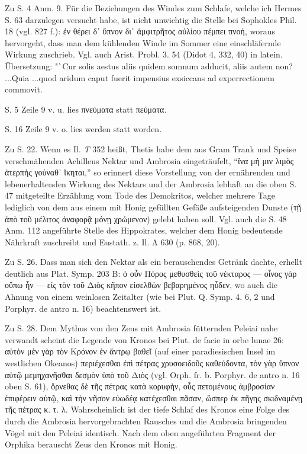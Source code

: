 \documentclass[a4paper, 11pt, oneside]{article}
\begin{document}
Zu S. 4 Anm. 9. Für die Beziehungen des Windes zum Schlafe, welche ich Hermes S. 63 darzulegen versucht habe, ist nicht unwichtig die Stelle bei Sophokles Phil. 18 (vgl. 827 f.): ἐν θέρει δ᾽ ὕπνον δι᾽ ἀμφιτρῆτος αὐλίου πέμπει πνοή, woraus hervorgeht, dass man dem kühlenden Winde im Sommer eine einschläfernde Wirkung zuschrieb. Vgl. auch Arist. Probl. 3. 54 (Didot 4, 332, 40) in latein. Übersetzung: "`Cur solis aestus aliis quidem somnum adducit, aliis autem non? ...Quia ...quod aridum caput fuerit impensius exsiccans ad experrectionem commovit.

S. 5 Zeile 9 v. u. lies πνεύματα statt πεύματα.

S. 16 Zeile 9 v. o. lies werden statt worden.

Zu S. 22. Wenn es Il. \emph{T} 352 heißt, Thetis habe dem aus Gram Trank und Speise verschmähenden Achilleus Nektar und Ambrosia eingeträufelt, "`ἵνα μή μιν λιμὸς ἀτερπὴς γούναθ᾽ ἵκηται,"' so erinnert diese Vorstellung von der ernährenden und lebenerhaltenden Wirkung des Nektars und der Ambrosia lebhaft an die oben S. 47 mitgeteilte Erzählung vom Tode des Demokritos, welcher mehrere Tage lediglich von dem aus einem mit Honig gefüllten Gefäße aufsteigenden Dunste (τῇ ἀπὸ τοῦ μέλιτος ἀναφορᾷ μόνῃ χρώμενον) gelebt haben soll. Vgl. auch die S. 48 Anm. 112 angeführte Stelle des Hippokrates, welcher dem Honig bedeutende Nährkraft zuschreibt und Eustath. z. Il. Λ 630 (p. 868, 20).

Zu S. 26. Dass man sich den Nektar als ein berauschendes Getränk dachte, erhellt deutlich aus Plat. Symp. 203 B: ὁ οὖν Πόρος μεθυσθεὶς τοῦ νέκταρος --- οἶνος γὰρ οὔπω ἦν --- εἰς τὸν τοῦ Διὸς κῆπον εἰσελθὼν βεβαρημένος ηὗδεν, wo auch die Ahnung von einem weinlosen Zeitalter (wie bei Plut. Q. Symp. 4. 6, 2 und Porphyr. de antro n. 16) beachtenswert ist.

Zu S. 28. Dem Mythus von den Zeus mit Ambrosia fütternden Peleiai nahe verwandt scheint die Legende von Kronos bei Plut. de facie in orbe lunae 26: αὐτὸν μὲν γὰρ τὸν Κρόνον ἐν ἄντρῳ βαθεῖ (auf einer paradiesischen Insel im westlichen Okeanos) περιέχεσθαι ἐπὶ πέτρας χρυσοειδοῦς καθεύδοντα, τὸν γὰρ ὕπνον αὐτῷ μεμηχανῆσθαι δεσμὸν ὑπὸ τοῦ Διὸς (vgl. Orph. fr. b. Porphyr. de antro n. 16 oben S. 61), ὄρνεθας δὲ τῆς πέτρας κατὰ κορυφὴν, οὖς πετομένους ἀμβροσίαν ἐπιφέρειν αὐτῷ, καὶ τὴν νῆσον εὐωδέᾳ κατέχεσθαι πᾶσαν, ὥσπερ ἐκ πῆγης σκιδναμένῃ τῆς πέτρας κ. τ. λ. Wahrscheinlich ist der tiefe Schlaf des Kronos eine Folge des durch die Ambrosia hervorgebrachten Rausches und die Ambrosia bringenden Vögel mit den Peleiai identisch. Nach dem oben angeführten Fragment der Orphika berauscht Zeus den Kronos mit Honig.
\end{document}
